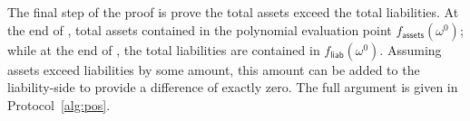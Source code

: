 The final step of the proof is prove the total assets exceed the total liabilities. At the end of \poa, total assets contained in the polynomial evaluation point $f_\mathsf{assets}(\omega^0)$; while at the end of \pol, the total liabilities are contained in $f_\mathsf{liab}(\omega^0)$. Assuming assets exceed liabilities by some amount, this amount can be added to the liability-side to provide a difference of exactly zero. The full argument is given in Protocol~\ref{alg:pos}.


